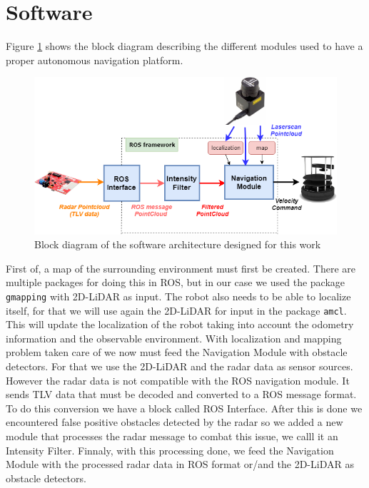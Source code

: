 \section{Software}
Figure \ref{fig::softsetup} shows the block diagram describing  the different modules used to have a proper autonomous navigation platform.
\begin{figure}[h] 
\centerline{\includegraphics [width=1.0 \textwidth]{imgs/chapter4/bd.png}}
\caption{Block diagram of the software architecture designed for this work}
\label{fig::softsetup}
\end{figure}

First of, a map of the surrounding  environment must first be created.  There are multiple packages for doing this in \ac{ROS}, but in our case we used the package \texttt{gmapping} with 2D-\ac{LiDAR} as input. The robot also needs to be able to localize itself, for that we will use again the 2D-\ac{LiDAR} for input in the package \texttt{amcl}. This will update the localization of the robot taking into account the odometry information and the observable environment. With localization and mapping problem taken care of we now must feed the Navigation Module with obstacle detectors. For that we use the 2D-LiDAR and the radar data as sensor sources.
 However the radar data is not compatible with the \ac{ROS} navigation module. It sends \ac{TLV} data that must be decoded and converted to a \ac{ROS} message format. To do this conversion we have a block called \ac{ROS} Interface. After this is done we encountered false positive obstacles detected by the radar so we added a new module that processes the radar message to combat this issue, we calll it an Intensity Filter. Finnaly, with this processing done, we feed the Navigation Module with the processed radar data in \ac{ROS} format or/and the 2D-\ac{LiDAR} as obstacle detectors. 

